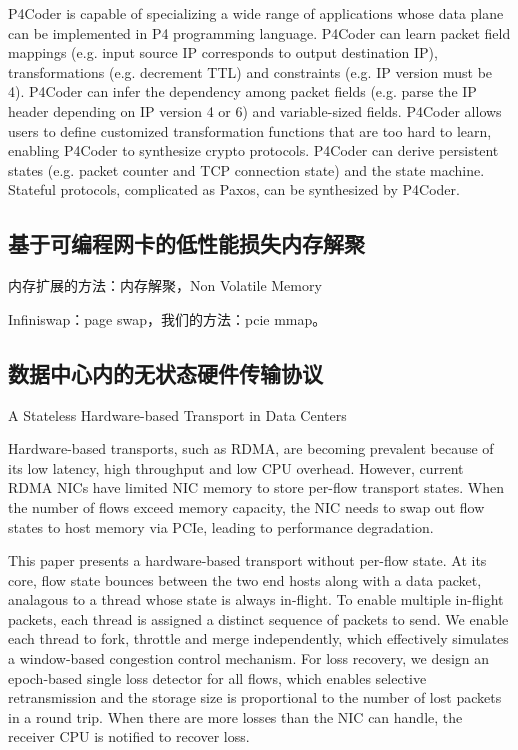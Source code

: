 P4Coder is capable of specializing a wide range of applications whose data plane can be implemented in P4 programming language. P4Coder can learn packet field mappings (e.g. input source IP corresponds to output destination IP), transformations (e.g. decrement TTL) and constraints (e.g. IP version must be 4). P4Coder can infer the dependency among packet fields (e.g. parse the IP header depending on IP version 4 or 6) and variable-sized fields. P4Coder allows users to define customized transformation functions that are too hard to learn, enabling P4Coder to synthesize crypto protocols. P4Coder can derive persistent states (e.g. packet counter and TCP connection state) and the state machine. Stateful protocols, complicated as Paxos, can be synthesized by P4Coder.


\subsection{基于可编程网卡的低性能损失内存解聚}

内存扩展的方法：内存解聚，Non Volatile Memory

Infiniswap：page swap，我们的方法：pcie mmap。

\subsection{数据中心内的无状态硬件传输协议}

A Stateless Hardware-based Transport in Data Centers

Hardware-based transports, such as RDMA, are becoming prevalent because of its low latency, high throughput and low CPU overhead. However, current RDMA NICs have limited NIC memory to store per-flow transport states. When the number of flows exceed memory capacity, the NIC needs to swap out flow states to host memory via PCIe, leading to performance degradation.

This paper presents a hardware-based transport without per-flow state. At its core, flow state bounces between the two end hosts along with a data packet, analagous to a thread whose state is always in-flight. To enable multiple in-flight packets, each thread is assigned a distinct sequence of packets to send. We enable each thread to fork, throttle and merge independently, which effectively simulates a window-based congestion control mechanism. For loss recovery, we design an epoch-based single loss detector for all flows, which enables selective retransmission and the storage size is proportional to the number of lost packets in a round trip. When there are more losses than the NIC can handle, the receiver CPU is notified to recover loss.


